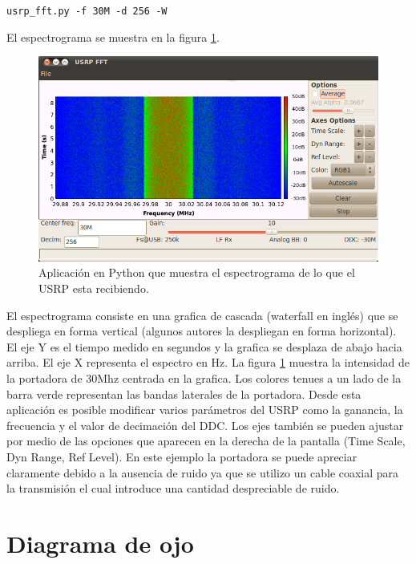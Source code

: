 \begin{center}
\verb|usrp_fft.py -f 30M -d 256 -W|
\end{center}

El espectrograma se muestra en la figura \ref{fig:spectrogramgui}.

\begin{figure}[htp]
  \centering
  \includegraphics[scale=0.7]{figs/spectrogramgui}
  \vspace{0.3in}
  \caption{Aplicaci\'on en Python que muestra el espectrograma de lo que el USRP esta recibiendo.}
  \label{fig:spectrogramgui}
\end{figure}

El espectrograma consiste en una grafica de cascada (waterfall en ingl\'es) que se despliega en
forma vertical (algunos autores la despliegan en forma horizontal). El eje Y es el tiempo medido en
segundos y la grafica se desplaza de abajo hacia arriba. El eje X representa el espectro en Hz. La
figura \ref{fig:spectrogramgui} muestra la intensidad de la portadora de 30Mhz centrada en la
grafica. Los colores tenues a un lado de la barra verde representan las bandas laterales de la
portadora. Desde esta aplicaci\'on es posible modificar varios par\'ametros del USRP como la
ganancia, la frecuencia y el valor de decimaci\'on del DDC. Los ejes tambi\'en se pueden ajustar por
medio de las opciones que aparecen en la derecha de la pantalla (Time Scale, Dyn Range, Ref Level).
En este ejemplo la portadora se puede apreciar claramente debido a la ausencia de ruido ya que se
utilizo un cable coaxial para la transmisi\'on el cual introduce una cantidad despreciable de ruido.
\section{Diagrama de ojo}

